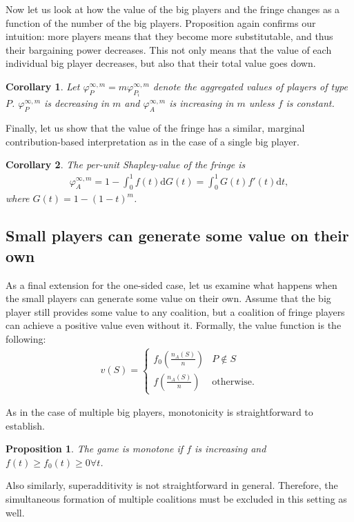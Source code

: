 \documentclass[a4paper]{article}
\newtheorem{proposition}{Proposition}
\newtheorem{corollary}{Corollary}
\newcommand{\dt}{\mathrm{d}t}
\newcommand{\dG}{\mathrm{d}G}
\begin{document}
Now let us look at how the value of the big players and the fringe changes as a function of the number of the big players.
Proposition  again confirms our intuition: more players means that they become more substitutable, and thus their bargaining power decreases.
This not only means that the value of each individual big player decreases, but also that their total value goes down.

\begin{corollary}
    \label{cor:multiple_platforms_2}
    Let $\varphi_{P}^{\infty, m} = m\varphi_{P_i}^{\infty, m}$ denote the aggregated values of players of type $P$. $\varphi_{P}^{\infty, m}$ is decreasing in $m$ and $\varphi_{A}^{\infty, m}$ is increasing in $m$ unless $f$ is constant.
\end{corollary}

Finally, let us show that the value of the fringe has a similar, marginal contribution-based interpretation as in the case of a single big player.

\begin{corollary}
    \label{cor:multiple_platforms}
    The per-unit Shapley-value of the fringe is
    \begin{align*}
        \varphi_A^{\infty, m} = 1 - \int_0^1 f(t) \dG(t) = \int_0^1 G(t) f'(t) \dt ,
    \end{align*}
    where $G(t) = 1 - (1-t)^m$.
\end{corollary}


\subsection{Small players can generate some value on their own}

As a final extension for the one-sided case, let us examine what happens when the small players can generate some value on their own.
Assume that the big player still provides some value to any coalition, but a coalition of fringe players can achieve a positive value even without it.
Formally, the value function is the following:
\begin{align*}
    v(S) = \begin{cases}
        f_0\left(\frac{n_A(S)}{n}\right) & P \notin S \\
        f\left(\frac{n_A(S)}{n}\right)   & \text{otherwise}.
    \end{cases}
\end{align*}

As in the case of multiple big players, monotonicity is straightforward to establish.
\begin{proposition}
    The game is monotone if $f$ is increasing and $f(t) \geq f_0(t) \geq 0 \forall t$.
\end{proposition}
Also similarly, superadditivity is not straightforward in general.
Therefore, the simultaneous formation of multiple coalitions must be excluded in this setting as well.
\end{document}
